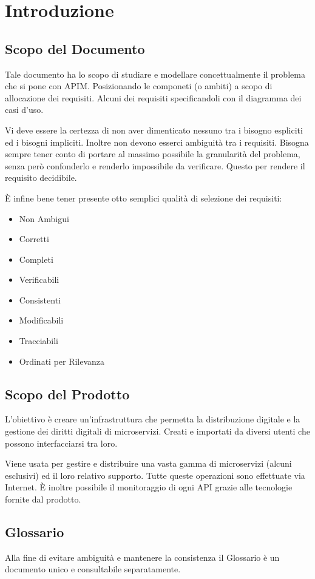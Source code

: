 \documentclass[12pt,a4paper,titlepage]{article}
\begin{document}
	
	
	\section{Introduzione}
	\subsection{Scopo del Documento}
	Tale documento ha lo scopo di studiare e modellare concettualmente il problema che si pone con APIM. Posizionando le componeti (o ambiti) a scopo di allocazione dei requisiti. Alcuni dei requisiti specificandoli con il diagramma dei casi d'uso.
	
	Vi deve essere la certezza di non aver dimenticato nessuno tra i bisogno espliciti ed i bisogni impliciti. Inoltre non devono esserci ambiguità tra i requisiti.
	Bisogna sempre tener conto di portare al massimo possibile la granularità del problema, senza però confonderlo e renderlo impossibile da verificare. Questo per rendere il requisito decidibile.
	
	È infine bene tener presente otto semplici qualità di selezione dei requisiti:
	\begin{itemize}
		\item Non Ambigui
		\item Corretti
		\item Completi
		\item Verificabili
		\item Consistenti
		\item Modificabili
		\item Tracciabili
		\item Ordinati per Rilevanza
	\end{itemize}
	\subsection{Scopo del Prodotto}
	L'obiettivo è creare un'infrastruttura che permetta la distribuzione digitale e la gestione dei diritti digitali di microservizi. Creati e importati da diversi utenti che possono interfacciarsi tra loro.
	
	Viene usata per gestire e distribuire una vasta gamma di microservizi (alcuni esclusivi) ed il loro relativo supporto. Tutte queste operazioni sono effettuate via Internet.
	È inoltre possibile il monitoraggio di ogni API grazie alle tecnologie fornite dal prodotto. 
	\subsection{Glossario}
	Alla fine di evitare ambiguità e mantenere la consistenza il Glossario è un documento unico e consultabile separatamente.
	
\end{document}
